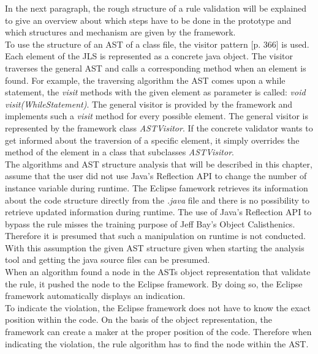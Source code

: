 In the next paragraph, the rough structure of a rule validation will be explained to give an overview about which steps have to be done in the prototype and which structures and mechanism are given by the framework.
\\

To use the structure of an \acf{AST} of a class file, the visitor pattern \cite{gof}[p. 366] is used. Each element of the \acf{JLS} is represented as a concrete java object. The visitor traverses the general \acf{AST} and calls a corresponding method when an element is found. For example, the traversing algorithm the \acf{AST} comes upon a while statement, the \textit{visit} methods with the given element as parameter is called: \textit{void visit(WhileStatement)}. The general visitor is provided by the framework and implements such a \textit{visit} method for every possible element. The general visitor is represented by the framework class \textit{ASTVisitor}. If the concrete validator wants to get informed about the traversion of a specific element, it simply overrides the method of the element in a class that subclasses \textit{ASTVisitor}. 
\\

The algorithms and \acf{AST} structure analysis that will be described in this chapter, assume that the user did not use Java's Reflection \acf{API} to change the number of instance variable during runtime. The Eclipse famework retrieves its information about the code structure directly from the \textit{.java} file and there is no possibility to retrieve updated information during runtime. The use of Java's Reflection \acf{API} to bypass the rule misses the training purpose of Jeff Bay's Object Calisthenics.  Therefore it is presumed that such a manipulation on runtime is not conducted. With this assumption the given \acf{AST} structure given when starting the analysis tool and getting the java source files can be presumed.
\\

When an algorithm found a node in the \acf{AST}s object representation that validate the rule, it pushed the node to the Eclipse framework. By doing so, the Eclipse framework automatically displays an indication. 
\\

To indicate the violation, the Eclipse framework does not have to know the exact position within the code. On the basis of the object representation, the framework can create a maker at the proper position of the code. Therefore when indicating the violation, the rule algorithm has to find the node within the \acf{AST}.
\\

